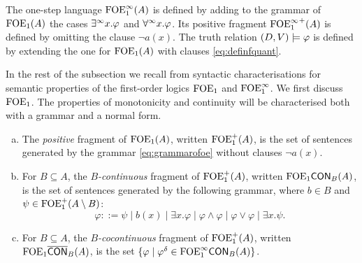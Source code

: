 \begin{definition}
The one-step language $\mathrm{FOE}^{\infty}_1(A)$ is defined by adding to the grammar of $\mathrm{FOE}_1(A)$ the cases $\exists^\infty x. \varphi$ and $\forall^\infty x. \varphi$. Its positive fragment ${\mathrm{FOE}^{\infty}_1}^{+}(A)$ is defined by omitting the clause $\lnot a(x)$. The truth relation $(D, V) \models \varphi$ is defined by extending the one for $\mathrm{FOE}_1(A)$ with clauses \eqref{eq:definfquant}.
\end{definition}


In the rest of the subsection we recall from \cite{??} syntactic characterisations for semantic properties of the first-order logics $\mathrm{FOE}_1$ and $\mathrm{FOE}^{\infty}_1$. We first discuss $\mathrm{FOE}_1$. The properties of monotonicity and continuity will be characterised both with a grammar and a normal form.

\begin{definition}
\begin{enumerate}[(a)]
\item The \emph{positive} fragment of $\mathrm{FOE}_1(A)$, written $\mathrm{FOE}_1^{+}(A)$, is the set of sentences generated by the grammar \eqref{eq:grammarofoe} without clauses $\lnot a(x)$. 
\item For $B \subseteq A$, the \emph{$B$-continuous} fragment of $\mathrm{FOE}_1^{+}(A)$, written $\mathrm{FOE}_1\mathsf{CON}_{B}(A)$, is the set of sentences generated by the following grammar, where $b \in B$ and $\psi \in \mathrm{FOE}_1^{+}(A \setminus B)$:
\[
\varphi ::= \psi \mid b(x) \mid \exists x.\varphi \mid \varphi \land \varphi \mid \varphi \lor \varphi \mid \exists x. \psi.
\]
\item For $B \subseteq A$, the \emph{$B$-cocontinuous} fragment of $\mathrm{FOE}_1^{+}(A)$, written $\mathrm{FOE}_1\overline{\mathsf{CON}}_{B}(A)$, is the set $\{\varphi \mid \varphi^\delta \in \mathrm{FOE}^{\infty}_1\mathsf{CON}_{B}(A)\}$.
\end{enumerate}
\end{definition}

